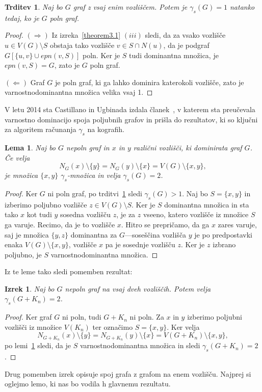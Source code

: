 \documentclass[12pt,a4paper,twoside]{article}
\theoremstyle{definition} %
\theoremstyle{plain} %
\newtheorem{lema}[definicija]{Lema}
\newtheorem{izrek}[definicija]{Izrek}
\newtheorem{trditev}[definicija]{Trditev}
\numberwithin{equation}{section}  %
\begin{document}
\begin{trditev}\label{theorem3.3}
Naj bo $G$ graf z vsaj enim vozliščem. Potem je $\gamma_s(G) = 1$ natanko tedaj, ko je $G$ poln graf.
\end{trditev}
\begin{proof}
$(\Rightarrow)$ Iz izreka~\ref{theorem3.1} $(iii)$ sledi, da za vsako vozlišče $u \in V(G) \setminus S$ obstaja tako vozlišče $v \in S \cap N(u)$, da je podgraf $G[\{u,v\} \cup epn(v,S)]$ poln. Ker je $S$ tudi dominantna množica, je $epn(v, S) = G$, zato je $G$ poln graf.

\medskip
$(\Leftarrow)$ Graf $G$ je poln graf, ki ga lahko dominira katerokoli vozlišče, zato je varnostnodominantna množica velika vsaj 1.
\end{proof}

V letu 2014 sta Castillano in Ugbinada izdala članek~\cite{castillano2014secure}, v katerem sta preučevala varnostno dominacijo spoja poljubnih grafov in prišla do rezultatov, ki so ključni za algoritem računanja $\gamma_s$ na kografih.

\begin{lema}\label{lemaZaGammaS2}{\rm{\cite[Theorem 2.6 $(i)$]{castillano2014secure}}}
Naj bo $G$ nepoln graf in $x$ in $y$ različni vozlišči, ki dominirata graf $G$. Če velja $$N_G(x) \setminus \{y\} = N_G(y) \setminus \{x\} = V(G) \setminus \{x, y\},$$ je množica $\{x, y\}$ $\gamma_s$-množica in velja $\gamma_s(G) = 2$.
\end{lema}
\begin{proof}
Ker $G$ ni poln graf, po trditvi~\ref{theorem3.3} sledi $\gamma_s(G) > 1$. Naj bo $S = \{x, y\}$ in izberimo poljubno vozlišče $z \in V(G) \setminus S$. Ker je $S$ dominantna množica in sta tako $x$ kot tudi $y$ sosedna vozlišču $z$, je za $z$ vseeno, katero vozlišče iz množice $S$ ga varuje. Recimo, da je to vozlišče $x$. Hitro se prepričamo, da ga $x$ zares varuje, saj je množica $\{y, z\}$ dominantna za $G$---soseščina vozlišča $y$ je po predpostavki enaka $V(G) \setminus \{x, y\}$, vozlišče $x$ pa je sosednje vozlišču $z$. Ker je $z$ izbrano poljubno, je $S$ varnostnodominantna množica.
\end{proof}
Iz te leme tako sledi pomemben rezultat:
\begin{izrek}\label{theorem3.4}
Naj bo $G$ nepoln graf na vsaj dveh vozliščih. Potem velja $\gamma_s(G + K_n) = 2$.
\end{izrek}
\begin{proof} Ker graf $G$ ni poln, tudi $G + K_n$ ni poln. Za $x$ in $y$ izberimo poljubni vozlišči iz množice $V(K_n)$ ter označimo $S = \{x, y\}$. Ker velja $$N_{G+K_n}(x) \setminus \{y\} = N_{G+K_n}(y) \setminus \{x\} = V({G+K_n}) \setminus \{x, y\},$$po lemi~\ref{lemaZaGammaS2} sledi, da je $S$ varnostnodominantna množica in sledi $\gamma_s(G + K_n) = 2$. 
\end{proof}
Drug pomemben izrek opisuje spoj grafa z grafom na enem vozlišču. Najprej si oglejmo lemo, ki nas bo vodila h glavnemu rezultatu.
\end{document}
